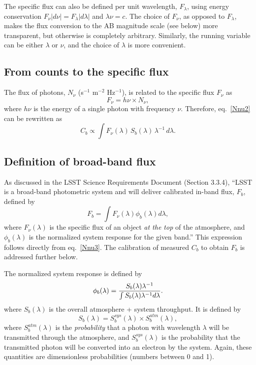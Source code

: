 \documentclass{emulateapj}
\begin{document}
The specific flux can also be defined per unit wavelength, $F_\lambda$, using energy 
conservation $F_\nu |d\nu|=F_\lambda |d\lambda|$ and $\lambda \nu = c$.
The choice of $F_\nu$, as opposed to $F_\lambda$, makes the flux conversion 
to the AB magnitude scale (see below) more transparent, but otherwise is completely
arbitrary. Similarly, the running variable can be either  $\lambda$ or $\nu$, and the 
choice of $\lambda$ is more convenient.



\subsection{From counts to the specific flux} 

The flux of photons, $N_\nu$ (s$^{-1}$ m$^{-2}$ Hz$^{-1}$), is related to the specific flux $F_\nu$ as
\begin{equation}
\label{FNnu}
                 F_\nu = h \nu \times N_\nu,  
\end{equation}
where $h\nu$ is the energy of a single photon with frequency $\nu$. Therefore,
eq.~\ref{Nnu2} can be rewritten as
\begin{equation}
\label{Nnu3}
         C_b\propto \int F_\nu(\lambda) \, S_b(\lambda) \, \lambda^{-1} \, d\lambda. 
\end{equation}


\subsection{Definition of broad-band flux} 

As discussed in the LSST Science Requirements Document (Section 3.3.4), ``LSST is a 
broad-band photometric system and will deliver calibrated in-band flux, $F_b$, 
defined by 
\begin{equation}
\label{Fb}
              F_b = \int{F_\nu(\lambda) \phi_b(\lambda) d\lambda},
\end{equation}
where $F_\nu(\lambda)$ is the specific flux of an object {\it at the top} of the atmosphere, 
and $\phi_b(\lambda)$ is the normalized system response for the given band.'' This
expression follows directly from eq.~\ref{Nnu3}. The calibration of measured $C_b$ to obtain
$F_b$ is addressed further below. 

The normalized system response is defined by 
\begin{equation}
\label{PhiDef}
\phi_b(\lambda) = {S_b(\lambda) \lambda^{-1} \over \int{S_b(\lambda) \lambda^{-1} d\lambda}}.
\end{equation}
where $S_b(\lambda)$ is the overall atmosphere + system throughput.  It is defined by
\begin{equation}
\label{SDef}
         S_b(\lambda) = S_b^{sys}(\lambda) \times S_b^{atm}(\lambda),
\end{equation}
where $S_b^{atm}(\lambda)$ is the {\it probability} that a photon 
with wavelength $\lambda$ will be transmitted through the atmosphere, and
$S_b^{sys}(\lambda)$ is the probability that the transmitted photon will be 
converted into an electron by the system. Again, these quantities are
dimensionless probabilities (numbers between 0 and 1). 
\end{document}
